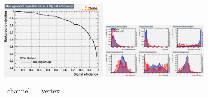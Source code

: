 \begin{figure}[htbp]
	\includegraphics[width=0.48\textwidth]{6_Search/Figures/MVAtechnics/singletopzct/eeu/rejBvsS.png}
	\includegraphics[width=0.48\textwidth]{6_Search/Figures/MVAtechnics/singletopzct/eeu/variables_id_c1.png}
	\caption{\eemu\ channel. \STSR: \Zct\ vertex }
	\label{image:Figureseeusingletopzct}
\end{figure}


